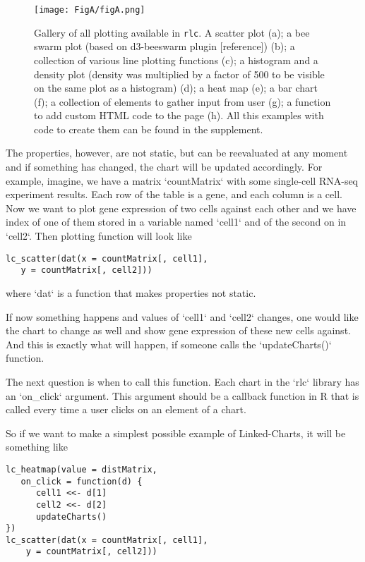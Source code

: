 \documentclass[twocolumn,10pt]{article}
\begin{document}
\begin{figure*}
	\texttt{[image: FigA/figA.png]}
	\caption{Gallery of all plotting available in \texttt{rlc}. A scatter plot (a); a bee swarm plot (based on d3-beeswarm plugin [reference]) (b); a collection of various line plotting functions (c); a histogram and a density plot (density was multiplied by a factor of 500 to be visible on the same plot as a histogram) (d); a heat map (e); a bar chart (f); a collection of elements to gather input from user (g); a function to add custom HTML code to the page (h). All this examples with code to create them can be found in the supplement.}
	\label{FigA}
\end{figure*}



The properties, however, are not static, but can be reevaluated at any moment and if something has changed, the chart will be updated accordingly. For example, imagine, we have a matrix `countMatrix` with some single-cell RNA-seq experiment results. Each row of the table is a gene, and each column is a cell. Now we want to plot gene expression of two cells against each other and we have index of one of them stored in a variable named `cell1` and of the second on in `cell2`. Then plotting function will look like

\begin{verbatim}
lc_scatter(dat(x = countMatrix[, cell1], 
   y = countMatrix[, cell2]))
\end{verbatim}

where `dat` is a function that makes properties not static.

If now something happens and values of `cell1` and `cell2` changes, one would like the chart to change as well and show gene expression of these new cells against. And this is exactly what will happen, if someone calls the `updateCharts()` function. 

The next question is when to call this function. Each chart in the `rlc` library has an `on_click` argument. This argument should be a callback function in R that is called every time a user clicks on an element of a chart.

So if we want to make a simplest possible example of Linked-Charts, it will be something like

\begin{verbatim}
lc_heatmap(value = distMatrix, 
   on_click = function(d) {
      cell1 <<- d[1]
      cell2 <<- d[2]
      updateCharts()
})
lc_scatter(dat(x = countMatrix[, cell1],
	y = countMatrix[, cell2]))
\end{verbatim}
\end{document}
